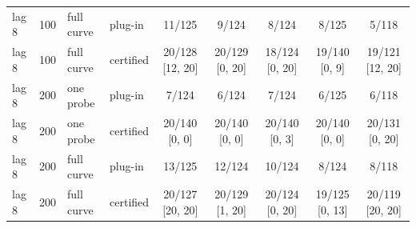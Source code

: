 \begin{tabular}{llllccccc}
lag 8 & 100 & full curve & plug-in & 11/125 & 9/124 & 8/124 & 8/125 & 5/118 \\
lag 8 & 100 & full curve & certified & 20/128 [12, 20] & 20/129 [0, 20] & 18/124 [0, 20] & 19/140 [0, 9] & 19/121 [12, 20] \\
lag 8 & 200 & one probe & plug-in & 7/124 & 6/124 & 7/124 & 6/125 & 6/118 \\
lag 8 & 200 & one probe & certified & 20/140 [0, 0] & 20/140 [0, 0] & 20/140 [0, 3] & 20/140 [0, 0] & 20/131 [0, 20] \\
lag 8 & 200 & full curve & plug-in & 13/125 & 12/124 & 10/124 & 8/124 & 8/118 \\
lag 8 & 200 & full curve & certified & 20/127 [20, 20] & 20/129 [1, 20] & 20/124 [0, 20] & 19/125 [0, 13] & 20/119 [20, 20] \\
\bottomrule
\end{tabular}
